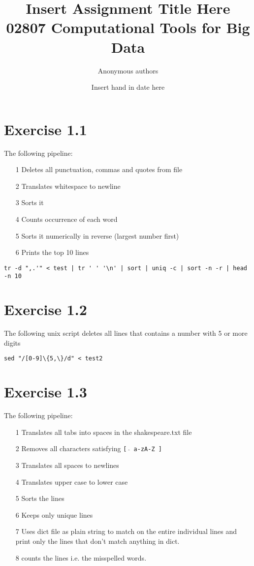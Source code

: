 \documentclass{article}
\title{Insert Assignment Title Here\\02807 Computational Tools for Big Data}
\author{Anonymous authors}
\date{Insert hand in date here}
\begin{document}
\maketitle

\section{Exercise 1.1}

The following pipeline:
\begin{itemize}
\item[1] Deletes all punctuation, commas and quotes from file
\item[2] Translates whitespace to newline
\item[3] Sorts it
\item[4] Counts occurrence of each word
\item[5] Sorts it numerically in reverse (largest number first)
\item[6] Prints the top 10 lines
\end{itemize}

\begin{verbatim}
tr -d ",.'" < test | tr ' ' '\n' | sort | uniq -c | sort -n -r | head -n 10
\end{verbatim}

\section{Exercise 1.2}

The following unix script deletes all lines that contains a number with 5 or more digits

\begin{verbatim}
sed "/[0-9]\{5,\}/d" < test2
\end{verbatim}


\section{Exercise 1.3}

The following pipeline:
\begin{itemize}
\item[1] Translates all tabs into spaces in the shakespeare.txt file
\item[2] Removes all characters satisfying \texttt{[\ $\hat{}$\ a-zA-Z ]}
\item[3] Translates all spaces to newlines
\item[4] Translates upper case to lower case
\item[5] Sorts the lines
\item[6] Keeps only unique lines
\item[7] Uses dict file as plain string to match on the entire individual lines and print only the lines that don't match anything in dict.
\item[8] counts the lines i.e. the misspelled words.
\end{itemize}
\end{document}
